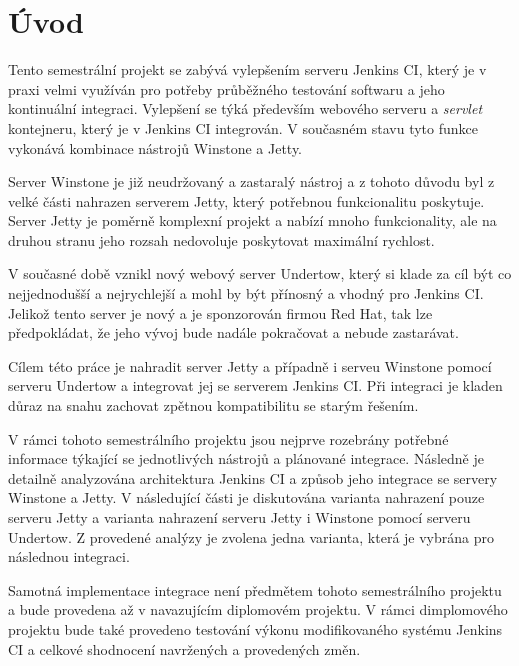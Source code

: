 
\chapter{Úvod}
    Tento semestrální projekt se zabývá vylepšením serveru Jenkins CI, který je v praxi velmi využíván pro potřeby průběžného testování softwaru
    a jeho kontinuální integraci. Vylepšení se týká především webového serveru a \emph{servlet} kontejneru, který je v Jenkins CI integrován. 
    V současném stavu tyto funkce vykonává kombinace nástrojů Winstone a Jetty. 
    
    Server Winstone je již neudržovaný a zastaralý nástroj a z tohoto důvodu
    byl z velké části nahrazen serverem Jetty, který potřebnou funkcionalitu poskytuje. Server Jetty je poměrně komplexní projekt a nabízí
    mnoho funkcionality, ale na druhou stranu jeho rozsah nedovoluje poskytovat maximální rychlost.
    
    V současné době vznikl nový webový server Undertow, který si klade za cíl být co nejjednodušší a nejrychlejší a mohl by být přínosný
    a vhodný pro Jenkins CI. Jelikož tento server je nový a je sponzorován firmou Red Hat, tak lze předpokládat, že jeho vývoj
    bude nadále pokračovat a nebude zastarávat.

    Cílem této práce je nahradit server Jetty a případně i serveu Winstone pomocí serveru Undertow 
    a integrovat jej se serverem Jenkins CI. Při integraci je kladen důraz na snahu
    zachovat zpětnou kompatibilitu se starým řešením. 

    V rámci tohoto semestrálního projektu jsou nejprve rozebrány potřebné informace týkající se jednotlivých nástrojů a plánované integrace.
    Následně je detailně analyzována architektura Jenkins CI a způsob jeho integrace se servery Winstone a Jetty. V následující části
    je diskutována varianta nahrazení pouze serveru Jetty a varianta nahrazení serveru Jetty i Winstone pomocí serveru Undertow. 
    Z provedené analýzy je zvolena jedna varianta, která je vybrána pro následnou integraci.

    Samotná implementace integrace není předmětem tohoto semestrálního projektu a bude provedena až v navazujícím diplomovém projektu. 
    V rámci dimplomového projektu bude také provedeno testování výkonu modifikovaného systému Jenkins CI a celkové shodnocení navržených
    a provedených změn.


